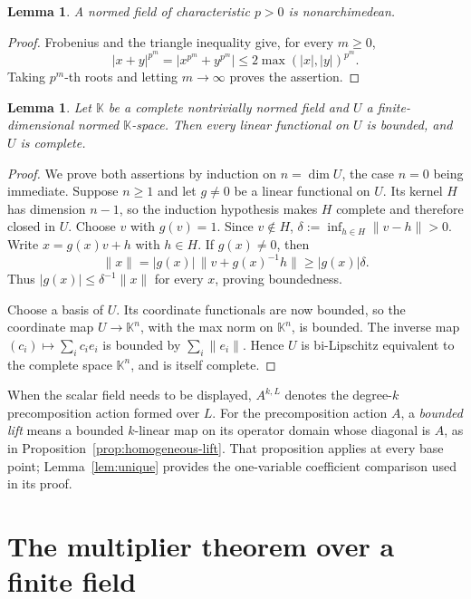 \documentclass[11pt]{amsart}
\newtheorem{lemma}[theorem]{Lemma}
\theoremstyle{definition}
\theoremstyle{remark}
\numberwithin{equation}{section}
\newcommand{\abs}[1]{\lvert #1\rvert}
\newcommand{\norm}[1]{\lVert #1\rVert}
\begin{document}
\begin{lemma}\label{lem:ultra}
A normed field of characteristic $p>0$ is nonarchimedean.
\end{lemma}

\begin{proof}
Frobenius and the triangle inequality give, for every $m\ge0$,
\[
 \abs{x+y}^{p^m}=\abs{x^{p^m}+y^{p^m}}
 \le2\max(\abs x,\abs y)^{p^m}.
\]
Taking $p^m$\nobreakdash-th roots and letting $m\to\infty$ proves the assertion.
\end{proof}

\begin{lemma}\label{lem:findim}
Let $\mathbb K$ be a complete nontrivially normed field and $U$ a finite-dimensional normed $\mathbb K$\nobreakdash-space. Then every
linear functional on $U$ is bounded, and $U$ is complete.
\end{lemma}

\begin{proof}
We prove both assertions by induction on $n=\dim U$, the case $n=0$ being immediate. Suppose $n\ge1$ and let $g\ne0$
be a linear functional on $U$. Its kernel $H$ has dimension $n-1$, so the induction hypothesis makes $H$ complete
and therefore closed in $U$. Choose $v$ with $g(v)=1$. Since $v\notin H$,
$\delta:=\inf_{h\in H}\norm{v-h}>0$. Write $x=g(x)v+h$ with $h\in H$. If $g(x)\ne0$, then
\[
\norm x=\abs{g(x)}\,\norm{v+g(x)^{-1}h}\ge\abs{g(x)}\delta.
\]
Thus $\abs{g(x)}\le\delta^{-1}\norm x$ for every $x$, proving boundedness.

Choose a basis of $U$. Its coordinate functionals are now bounded, so the coordinate map
$U\to\mathbb K^n$, with the max norm on $\mathbb K^n$, is bounded. The inverse map
$(c_i)\mapsto\sum_ic_ie_i$ is bounded by $\sum_i\norm{e_i}$. Hence $U$ is bi-Lipschitz equivalent to the complete
space $\mathbb K^n$, and is itself complete.
\end{proof}

When the scalar field needs to be displayed, $A^{k,L}$ denotes the degree-$k$ precomposition action formed over $L$. For the precomposition action $A$, a \emph{bounded lift} means a bounded $k$\nobreakdash-linear map on its operator domain whose diagonal is $A$, as in Proposition~\ref{prop:homogeneous-lift}. That proposition applies at every base point; Lemma~\ref{lem:unique} provides the one-variable coefficient comparison used in its proof.

\section{The multiplier theorem over a finite field}\label{app:FF}\label{sec:FF}
\end{document}
